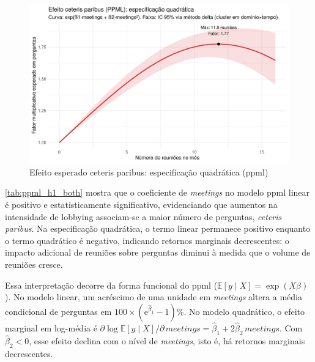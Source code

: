 \begin{figure}[htbp]
\centering
\includegraphics[width=\textwidth]{figures/h1_test/fig_effect_quadratic_ppml.pdf}
\caption{Efeito esperado ceteris paribus: especificação quadrática (\acrshort{ppml})}
\label{fig:effect_quadratic_ppml}
\end{figure}

\autoref{tab:ppml_h1_both} mostra que o coeficiente de \textit{meetings} no modelo \acrshort{ppml} linear é positivo e estatisticamente significativo, evidenciando que aumentos na intensidade de lobbying associam-se a maior número de perguntas, \textit{ceteris paribus}. Na especificação quadrática, o termo linear permanece positivo enquanto o termo quadrático é negativo, indicando retornos marginais decrescentes: o impacto adicional de reuniões sobre perguntas diminui à medida que o volume de reuniões cresce.

Essa interpretação decorre da forma funcional do \acrshort{ppml} (\(\mathbb{E}[y\mid X]=\exp(X\beta)\)). No modelo linear, um acréscimo de uma unidade em \textit{meetings} altera a média condicional de perguntas em \(100\times(\mathrm{e}^{\hat{\beta}_1}-1)\%\). No modelo quadrático, o efeito marginal em log-média é \(\partial\log\mathbb{E}[y\mid X]/\partial\,\textit{meetings}=\hat{\beta}_1+2\hat{\beta}_2\,\textit{meetings}\). Com \(\hat{\beta}_2<0\), esse efeito declina com o nível de \textit{meetings}, isto é, há retornos marginais decrescentes. 

